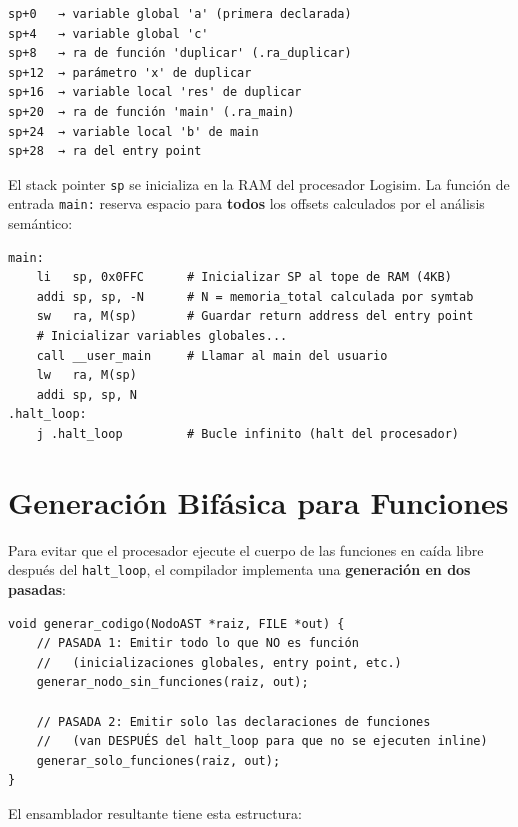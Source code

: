 \begin{verbatim}
sp+0   → variable global 'a' (primera declarada)
sp+4   → variable global 'c'
sp+8   → ra de función 'duplicar' (.ra_duplicar)
sp+12  → parámetro 'x' de duplicar
sp+16  → variable local 'res' de duplicar
sp+20  → ra de función 'main' (.ra_main)
sp+24  → variable local 'b' de main
sp+28  → ra del entry point
\end{verbatim}

El stack pointer \texttt{sp} se inicializa en la RAM del procesador Logisim. La función de entrada \texttt{main:} reserva espacio para \textbf{todos} los offsets calculados por el análisis semántico:

\begin{lstlisting}[style=asmstyle, caption={Prólogo del entry point}]
main:
    li   sp, 0x0FFC      # Inicializar SP al tope de RAM (4KB)
    addi sp, sp, -N      # N = memoria_total calculada por symtab
    sw   ra, M(sp)       # Guardar return address del entry point
    # Inicializar variables globales...
    call __user_main     # Llamar al main del usuario
    lw   ra, M(sp)
    addi sp, sp, N
.halt_loop:
    j .halt_loop         # Bucle infinito (halt del procesador)
\end{lstlisting}

\section{Generación Bifásica para Funciones}

Para evitar que el procesador ejecute el cuerpo de las funciones en caída libre después del \texttt{halt\_loop}, el compilador implementa una \textbf{generación en dos pasadas}:

\begin{lstlisting}[style=cstyle, caption={Generación bifásica en codegen.c}]
void generar_codigo(NodoAST *raiz, FILE *out) {
    // PASADA 1: Emitir todo lo que NO es función
    //   (inicializaciones globales, entry point, etc.)
    generar_nodo_sin_funciones(raiz, out);
    
    // PASADA 2: Emitir solo las declaraciones de funciones
    //   (van DESPUÉS del halt_loop para que no se ejecuten inline)
    generar_solo_funciones(raiz, out);
}
\end{lstlisting}

El ensamblador resultante tiene esta estructura:

